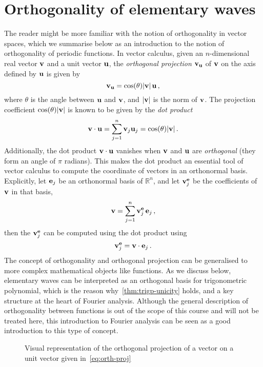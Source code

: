 \section{Orthogonality of elementary waves}
The reader might be more familiar with the notion of orthogonality in vector spaces, which we summarise below as an introduction to the notion of orthogonality of periodic functions.
In vector calculus, given an $n$-dimensional real vector $\mathbf{v}$ and a unit vector $\mathbf{u}$, the
\emph{orthogonal projection} $\mathbf{v}_{\mathbf{u}}$ of $\mathbf{v}$ on the axis defined by $\mathbf{u}$ is given by
\begin{equation}
  \label{eq:orth-proj}
  \mathbf{v}_{\mathbf{u}}=\cos(\theta)|\mathbf{v}|\,\mathbf{u}\,,
\end{equation}
where $\theta$ is the angle between $\mathbf{u}$ and $\mathbf{v}$, and $|\mathbf{v}|$ is the norm of $\mathbf{v}$. The
projection coefficient $\cos(\theta)|\mathbf{v}|$ is known to be given by the \emph{dot product}
\begin{equation}
  \mathbf{v}\cdot \mathbf{u}=\sum_{j=1}^n \mathbf{v}_j \mathbf{u}_j=\cos(\theta)|\mathbf{v}|\,.\label{eq:vec-dot}
\end{equation}
Additionally, the dot product $\mathbf{v}\cdot \mathbf{u}$ vanishes when $\mathbf{v}$ and $\mathbf{u}$ are \emph{orthogonal}
(\ie they form an angle of $\pi$ radians). This makes the dot product an essential tool of
vector calculus to compute the coordinate of vectors in an orthonormal basis. Explicitly,
let $\mathbf{e}_j$ be an orthonormal basis of $\mathbb{R}^n$, and let $\mathbf{v}^{\mathbf{e}}_j$ be the coefficients
of $\mathbf{v}$ in that basis, \ie
\begin{equation}
  \mathbf{v}=\sum_{j=1}^{n}\mathbf{v}^{\mathbf{e}}_j\,\mathbf{e}_j\,,
\end{equation}
then the $\mathbf{v}^{\mathbf{e}}_j$ can be computed using the dot product using
\begin{equation}
  \mathbf{v}^{\mathbf{e}}_j=\mathbf{v}\cdot \mathbf{e}_j\,.\label{eq:basis-proj}
\end{equation}
The concept of orthogonality and orthogonal projection can be generalised to more complex
mathematical objects like functions. As we discuss below, elementary waves can be
interpreted as an orthogonal basis for trigonometric polynomial, which is the reason
why~\cref{thm:trigp-unicity} holds, and a key structure at the heart of Fourier analysis.
Although the general description of orthogonality between functions is out of the scope of
this course and will not be treated here, this introduction to Fourier analysis can be
seen as a good introduction to this type of concept.
\begin{figure}[t]
  \caption{Visual representation of the orthogonal projection of a vector on a unit vector
  given in~\cref{eq:orth-proj}}
  \label{fig:orth-proj}
\end{figure}

